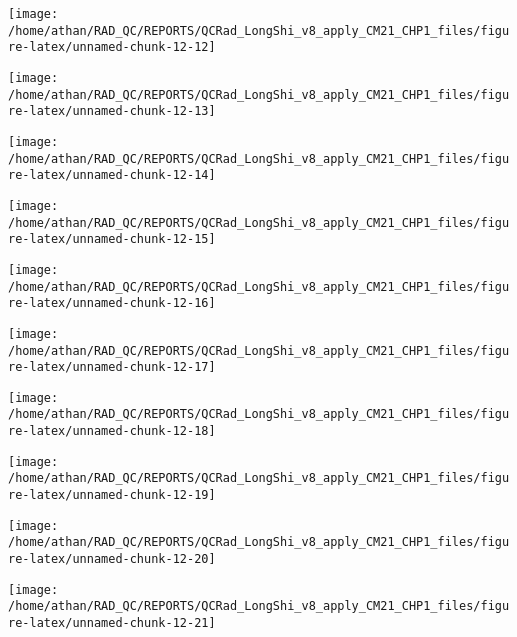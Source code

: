 \documentclass[
  10pt,
  a4paper,oneside]{article}
\begin{document}
\begin{center}\texttt{[image: /home/athan/RAD\_QC/REPORTS/QCRad\_LongShi\_v8\_apply\_CM21\_CHP1\_files/figure-latex/unnamed-chunk-12-12]} \end{center}

\begin{center}\texttt{[image: /home/athan/RAD\_QC/REPORTS/QCRad\_LongShi\_v8\_apply\_CM21\_CHP1\_files/figure-latex/unnamed-chunk-12-13]} \end{center}

\begin{center}\texttt{[image: /home/athan/RAD\_QC/REPORTS/QCRad\_LongShi\_v8\_apply\_CM21\_CHP1\_files/figure-latex/unnamed-chunk-12-14]} \end{center}

\begin{center}\texttt{[image: /home/athan/RAD\_QC/REPORTS/QCRad\_LongShi\_v8\_apply\_CM21\_CHP1\_files/figure-latex/unnamed-chunk-12-15]} \end{center}

\begin{center}\texttt{[image: /home/athan/RAD\_QC/REPORTS/QCRad\_LongShi\_v8\_apply\_CM21\_CHP1\_files/figure-latex/unnamed-chunk-12-16]} \end{center}

\begin{center}\texttt{[image: /home/athan/RAD\_QC/REPORTS/QCRad\_LongShi\_v8\_apply\_CM21\_CHP1\_files/figure-latex/unnamed-chunk-12-17]} \end{center}

\begin{center}\texttt{[image: /home/athan/RAD\_QC/REPORTS/QCRad\_LongShi\_v8\_apply\_CM21\_CHP1\_files/figure-latex/unnamed-chunk-12-18]} \end{center}

\begin{center}\texttt{[image: /home/athan/RAD\_QC/REPORTS/QCRad\_LongShi\_v8\_apply\_CM21\_CHP1\_files/figure-latex/unnamed-chunk-12-19]} \end{center}

\begin{center}\texttt{[image: /home/athan/RAD\_QC/REPORTS/QCRad\_LongShi\_v8\_apply\_CM21\_CHP1\_files/figure-latex/unnamed-chunk-12-20]} \end{center}

\begin{center}\texttt{[image: /home/athan/RAD\_QC/REPORTS/QCRad\_LongShi\_v8\_apply\_CM21\_CHP1\_files/figure-latex/unnamed-chunk-12-21]} \end{center}
\end{document}

